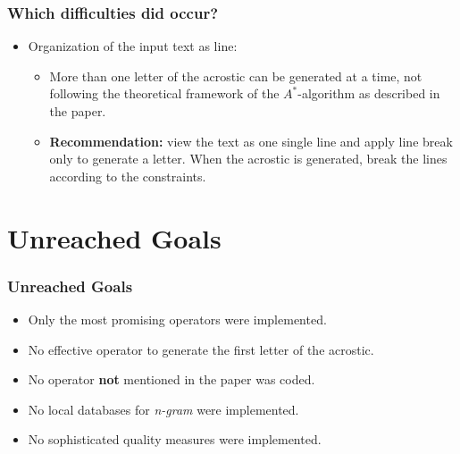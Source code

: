 \documentclass{beamer}
\begin{document}
\begin{frame}
\frametitle{Which difficulties did occur?}
\begin{itemize}
	\item Organization of the input text as line:
	\begin{itemize}
		
		
		\item More than one letter of the acrostic can be generated at a time, not following the theoretical framework of the $A^*$-algorithm as described in the paper.
		
		\item \textbf{Recommendation:} view the text as one single line and apply
			line break only to generate a letter. When the acrostic is generated,
			break the lines according to the constraints.
	\end{itemize}
\end{itemize}
\end{frame}


\section{Unreached Goals}
\begin{frame}
\frametitle{Unreached Goals}
\begin{itemize}
	\item Only the most promising operators were implemented.
	\item No effective operator to generate the first letter of the acrostic.
	\item No operator \textbf{not} mentioned in the paper was coded.
	\item No local databases for \emph{n-gram} were implemented.
	\item No sophisticated quality measures were implemented.
\end{itemize}
\end{frame}



\end{document}
